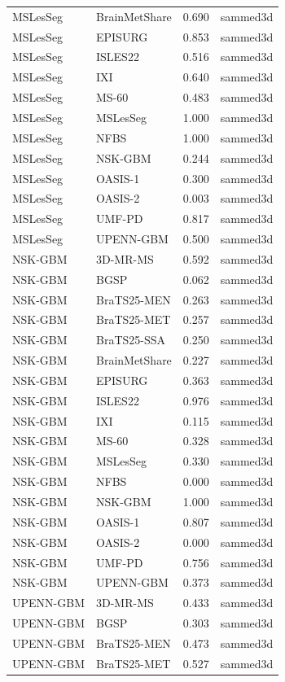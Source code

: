 \begin{tabular}{llrl}
MSLesSeg & BrainMetShare & 0.690 & sammed3d \\
MSLesSeg & EPISURG & 0.853 & sammed3d \\
MSLesSeg & ISLES22 & 0.516 & sammed3d \\
MSLesSeg & IXI & 0.640 & sammed3d \\
MSLesSeg & MS-60 & 0.483 & sammed3d \\
MSLesSeg & MSLesSeg & 1.000 & sammed3d \\
MSLesSeg & NFBS & 1.000 & sammed3d \\
MSLesSeg & NSK-GBM & 0.244 & sammed3d \\
MSLesSeg & OASIS-1 & 0.300 & sammed3d \\
MSLesSeg & OASIS-2 & 0.003 & sammed3d \\
MSLesSeg & UMF-PD & 0.817 & sammed3d \\
MSLesSeg & UPENN-GBM & 0.500 & sammed3d \\
NSK-GBM & 3D-MR-MS & 0.592 & sammed3d \\
NSK-GBM & BGSP & 0.062 & sammed3d \\
NSK-GBM & BraTS25-MEN & 0.263 & sammed3d \\
NSK-GBM & BraTS25-MET & 0.257 & sammed3d \\
NSK-GBM & BraTS25-SSA & 0.250 & sammed3d \\
NSK-GBM & BrainMetShare & 0.227 & sammed3d \\
NSK-GBM & EPISURG & 0.363 & sammed3d \\
NSK-GBM & ISLES22 & 0.976 & sammed3d \\
NSK-GBM & IXI & 0.115 & sammed3d \\
NSK-GBM & MS-60 & 0.328 & sammed3d \\
NSK-GBM & MSLesSeg & 0.330 & sammed3d \\
NSK-GBM & NFBS & 0.000 & sammed3d \\
NSK-GBM & NSK-GBM & 1.000 & sammed3d \\
NSK-GBM & OASIS-1 & 0.807 & sammed3d \\
NSK-GBM & OASIS-2 & 0.000 & sammed3d \\
NSK-GBM & UMF-PD & 0.756 & sammed3d \\
NSK-GBM & UPENN-GBM & 0.373 & sammed3d \\
UPENN-GBM & 3D-MR-MS & 0.433 & sammed3d \\
UPENN-GBM & BGSP & 0.303 & sammed3d \\
UPENN-GBM & BraTS25-MEN & 0.473 & sammed3d \\
UPENN-GBM & BraTS25-MET & 0.527 & sammed3d \\

\end{tabular}
